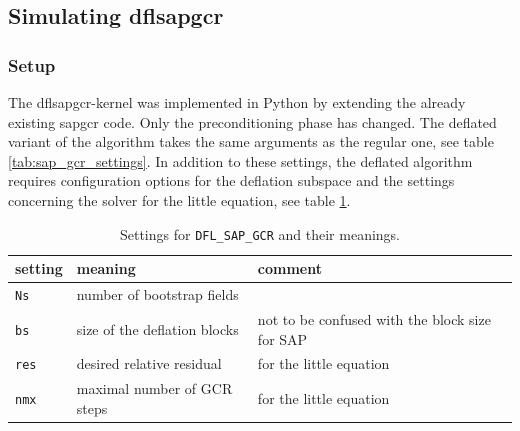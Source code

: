 \documentclass{article}
\theoremstyle{plain} %
\theoremstyle{convention} %
\theoremstyle{remark} %
\def\code#1{\texttt{#1}}
\numberwithin{equation}{section}
\begin{document}
\subsection{Simulating \acrshort*{dflsapgcr}}

\label{sec:dfl_sap_gcr_results}

\subsubsection{Setup}

The \acrshort{dflsapgcr}-kernel was implemented in Python by extending the already existing \acrshort{sapgcr} code. Only the preconditioning phase has changed. The deflated variant of the algorithm takes the same arguments as the regular one, see table \ref{tab:sap_gcr_settings}. In addition to these settings, the deflated algorithm requires configuration options for the deflation subspace and the settings concerning the solver for the little equation, see table \ref{tab:dfl_sap_gcr_settings}.

\begin{table}[H]
\centering
    \begin{tabular}{ |p{1.5cm}|p{6cm}|p{4.5cm}|  }
        \hline
        setting & meaning & comment \\
        \hline\hline
        \code{Ns}  & number of bootstrap fields & \\
        \hline
        \code{bs}  & size of the deflation blocks & not to be confused with the block size for SAP \\
        \hline
        \code{res}  & desired relative residual & for the little equation \\
        \hline
        \code{nmx}  & maximal number of GCR steps & for the little equation \\
        \hline
    \end{tabular}
    \caption{Settings for \code{DFL\_SAP\_GCR} and their meanings.}
    \label{tab:dfl_sap_gcr_settings}
\end{table}
\end{document}
